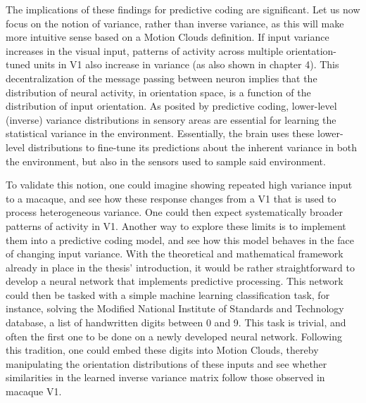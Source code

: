 The implications of these findings for predictive coding are significant. Let us now focus on the notion of variance, rather than inverse variance, as this will make more intuitive sense based on a Motion Clouds definition. If input variance increases in the visual input, patterns of activity across multiple orientation-tuned units in \gls{V1} also increase in variance (as also shown in chapter 4). This decentralization of the message passing between neuron implies that the distribution of neural activity, in orientation space, is a function of the distribution of input orientation.
As posited by predictive coding, lower-level (inverse) variance distributions in sensory areas are essential for learning the statistical variance in the environment. Essentially, the brain uses these lower-level distributions to fine-tune its predictions about the inherent variance in both the environment, but also in the sensors used to sample said environment. 

To validate this notion, one could imagine showing repeated high variance input to a macaque, and see how these response changes from a \gls{V1} that is used to process heterogeneous variance. One could then expect systematically broader patterns of activity in \gls{V1}.  Another way to explore these limits is to implement them into a predictive coding model, and see how this model behaves in the face of changing input variance. With the theoretical and mathematical framework already in place in the thesis' introduction, it would be rather straightforward to develop a neural network that implements predictive processing. This network could then be tasked with a simple machine learning classification task, for instance, solving the Modified National Institute of Standards and Technology database, a list of handwritten digits between 0 and 9. This task is trivial, and often the first one to be done on a newly developed neural network. Following this tradition, one could embed these digits into Motion Clouds, thereby manipulating the orientation distributions of these inputs and see whether similarities in the learned inverse variance matrix follow those observed in macaque \gls{V1}.

